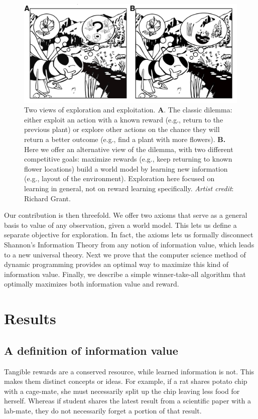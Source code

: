 \documentclass[fleqn,10pt]{wlscirep}
\begin{document}
\begin{figure}
	[tbhp] \centering 
	\includegraphics[width=.7\linewidth]{figures/fig1.png} 
	\caption{\label{fig:f1} Two views of exploration and exploitation. \textbf{A}. The classic dilemma: either exploit an action with a known reward (e.g., return to the previous plant) or explore other actions on the chance they will return a better outcome (e.g., find a plant with more flowers). \textbf{B.} Here we offer an alternative view of the dilemma, with two different competitive goals: maximize rewards (e.g., keep returning to known flower locations)  build a world model by learning new information (e.g., layout of the environment). Exploration here focused on learning in general, not on reward learning specifically. \textit{Artist credit}: Richard Grant.}
\end{figure}

Our contribution is then threefold. We offer two axioms that serve as a general basis to value of any observation, given a world model. This lets us define a separate objective for exploration. In fact, the axioms lets us formally disconnect Shannon's Information Theory from any notion of information value, which leads to a new universal theory. Next we prove that the computer science method of dynamic programming \cite{Bellmann1954,Sutton2018} provides an optimal way to maximize this kind of information value. Finally, we describe a simple winner-take-all algorithm that optimally maximizes both information value and reward. 

\section*{Results}
\subsection*{A definition of information value}
Tangible rewards are a conserved resource, while learned information is not. This makes them distinct concepts or ideas. For example, if a rat shares potato chip with a cage-mate, she must necessarily split up the chip leaving less food for herself. Whereas if student shares the latest result from a scientific paper with a lab-mate, they do not necessarily forget a portion of that result.
\end{document}
